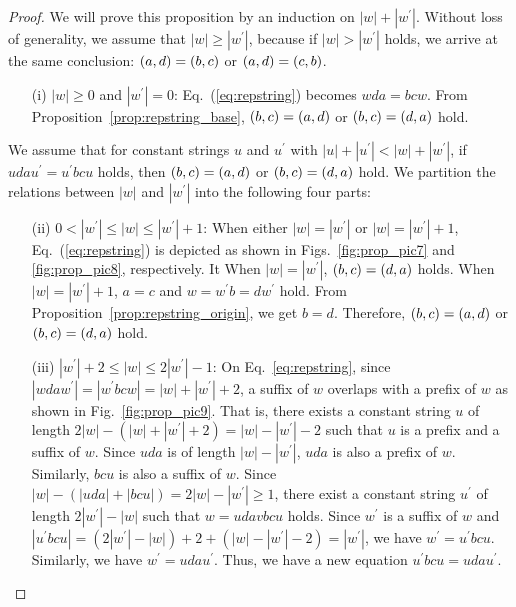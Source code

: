 \begin{proof}
We will prove this proposition by an induction on $|w| + |w^{\prime}|$.
Without loss of generality, we assume that $|w| \geq |w^{\prime}|$, because if $|w| > |w^{\prime}|$ holds, we arrive at the same conclusion: $(a,d) = (b,c)$ or $(a,d) = (c,b)$.
\begin{enumerate}
  \item[(i)] $|w| \geq 0$ and $|w^{\prime}|=0$:
  Eq.~(\ref{eq:repstring}) becomes $wda = bcw$. From Proposition~\ref{prop:repstring_base}, $(b,c) = (a,d)$ or $(b,c) = (d,a)$ hold.
\end{enumerate}
We assume that for constant strings $u$ and $u^{\prime}$ with $|u| + |u^{\prime}| < |w| + |w^{\prime}|$, if $udau^{\prime} = u^{\prime}bcu$ holds, then $(b,c) = (a,d)$ or $(b,c) = (d,a)$ hold.
We partition the relations between $|w|$ and $|w^{\prime}|$ into the following four parts:
\begin{enumerate}
\item[(ii)] $0 < |w^{\prime}| \le |w| \le |w^{\prime}|+1$:
When either $|w|=|w^{\prime}|$ or $|w|=|w^{\prime}|+1$, Eq.~(\ref{eq:repstring}) is depicted as shown in Figs.~\ref{fig:prop_pic7} and \ref{fig:prop_pic8}, respectively.
It When $|w|=|w^{\prime}|$, $(b,c) = (d,a)$ holds. When $|w|=|w^{\prime}|+1$, $a = c$ and $w = w^{\prime}b = dw^{\prime}$ hold.
From Proposition~\ref{prop:repstring_origin}, we get $b = d$.
Therefore, $(b,c) = (a,d)$ or $(b,c) = (d,a)$ hold.
%
\item[(iii)] $|w^{\prime}|+2 \le |w| \le 2|w^{\prime}| - 1$:
On Eq.~\ref{eq:repstring}, since $|wdaw^{\prime}| = |w^{\prime}bcw| = |w| + |w^{\prime}| + 2$, a suffix of $w$ overlaps with a prefix of $w$ as shown in Fig.~\ref{fig:prop_pic9}.
That is, there exists a constant string $u$ of length $2|w| - (|w| + |w^{\prime}| + 2) = |w| - |w^{\prime}| - 2$ such that $u$ is a prefix and a suffix of $w$.
Since $uda$ is of length $|w| - |w^{\prime}|$, $uda$ is also a prefix of $w$. Similarly, $bcu$ is also a suffix of $w$.
Since $|w| - (|uda| + |bcu|) = 2|w| - |w^{\prime}| \ge 1$, there exist a constant string $u^{\prime}$ of length $2|w^{\prime}| - |w|$ such that $w = udavbcu$ holds.
Since $w^{\prime}$ is a suffix of $w$ and $|u^{\prime}bcu| = (2|w^{\prime}| - |w|) + 2 + (|w| - |w^{\prime}| - 2) = |w^{\prime}|$, we have $w^{\prime} = u^{\prime}bcu$.
Similarly, we have $w^{\prime} = udau^{\prime}$. Thus, we have a new equation $u^{\prime}bcu = udau^{\prime}$.

\end{enumerate}
\end{proof}
